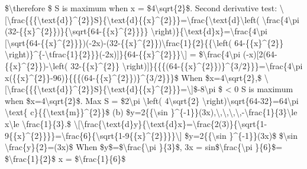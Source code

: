 \$\textbackslash therefore \$ S is maximum when x = \$4\textbackslash sqrt\{2\}\$.
Second derivative test: \textbackslash{[}\textbackslash frac\{\{\{\textbackslash text\{d\}\}\textasciicircum\{2\}\}S\}\{\textbackslash text\{d\}\{\{x\}\textasciicircum\{2\}\}\}=\textbackslash frac\{\textbackslash text\{d\}\textbackslash left(
\textbackslash frac\{4\textbackslash pi (32-\{\{x\}\textasciicircum\{2\}\})\}\{\textbackslash sqrt\{64-\{\{x\}\textasciicircum\{2\}\}\}\}
\textbackslash right)\}\{\textbackslash text\{d\}x\}=\textbackslash frac\{4\textbackslash pi
{[}\textbackslash sqrt\{64-\{\{x\}\textasciicircum\{2\}\}\})(-2x)-(32-\{\{x\}\textasciicircum\{2\}\})\textbackslash frac\{1\}\{2\}\{\{\textbackslash left(
64-\{\{x\}\textasciicircum\{2\}\} \textbackslash right)\}\textasciicircum\{-\textbackslash tfrac\{1\}\{2\}\}\}(-2x){]}\}\{64-\{\{x\}\textasciicircum\{2\}\}\}\textbackslash{]}
= \$\textbackslash frac\{4\textbackslash pi (-x){[}2(64-\{\{x\}\textasciicircum\{2\}\})-\textbackslash left(
32-\{\{x\}\textasciicircum\{2\}\} \textbackslash right){]}\}\{\{\{(64-\{\{x\}\textasciicircum\{2\}\})\}\textasciicircum\{3/2\}\}\}=\textbackslash frac\{4\textbackslash pi
x(\{\{x\}\textasciicircum\{2\}\}-96)\}\{\{\{(64-\{\{x\}\textasciicircum\{2\}\})\}\textasciicircum\{3/2\}\}\}\$
When \$x=4\textbackslash sqrt\{2\},\$ \textbackslash{[}\textbackslash frac\{\{\{\textbackslash text\{d\}\}\textasciicircum\{2\}\}S\}\{\textbackslash text\{d\}\{\{x\}\textasciicircum\{2\}\}\}=\textbackslash{]}\$-8\textbackslash pi
\$ < 0 S is maximum when \$x=4\textbackslash sqrt\{2\}\$. Max S =
\$2\textbackslash pi \textbackslash left( 4\textbackslash sqrt\{2\}
\textbackslash right)\textbackslash sqrt\{64-32\}=64\textbackslash pi
\textbackslash text\{ c\}\{\{\textbackslash text\{m\}\}\textasciicircum\{2\}\}\$
(b) \$y=2\{\{\textbackslash sin \}\textasciicircum\{-1\}\}(3x),\textbackslash ,\textbackslash ,\textbackslash ,\textbackslash ,-\textbackslash frac\{1\}\{3\}\textbackslash le
x\textbackslash le \textbackslash frac\{1\}\{3\}.\$ \textbackslash{[}\textbackslash frac\{\textbackslash text\{d\}y\}\{\textbackslash text\{d\}x\}=\textbackslash frac\{2(3)\}\{\textbackslash sqrt\{1-9\{\{x\}\textasciicircum\{2\}\}\}\}=\textbackslash frac\{6\}\{\textbackslash sqrt\{1-9\{\{x\}\textasciicircum\{2\}\}\}\}\textbackslash{]}
\$y=2\{\{\textbackslash sin \}\textasciicircum\{-1\}\}(3x)\$ \$\textbackslash sin
\textbackslash frac\{y\}\{2\}=(3x)\$ When \$y\$=\$\textbackslash frac\{\textbackslash pi
\}\{3\}\$, 3x = sin\$\textbackslash frac\{\textbackslash pi \}\{6\}\$=
\$\textbackslash frac\{1\}\{2\}\$ x = \$\textbackslash frac\{1\}\{6\}\$
